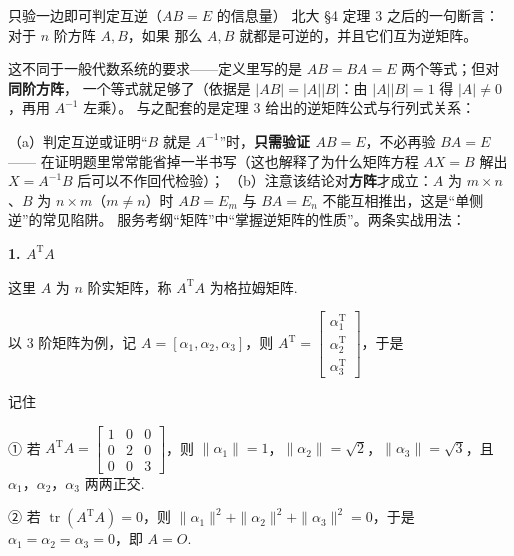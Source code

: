 \begin{fdeep}{只验一边即可判定互逆（$AB=E$ 的信息量）}
北大 §4 定理 3 之后的一句断言：对于 $n$ 阶方阵 $A,B$，如果
那么 $A,B$ 就都是可逆的，并且它们互为逆矩阵。

这不同于一般代数系统的要求——定义里写的是 $AB=BA=E$ 两个等式；但对\textbf{同阶方阵}，
一个等式就足够了（依据是 $|AB|=|A||B|$：由 $|A||B|=1$ 得 $|A|\ne0$，再用 $A^{-1}$ 左乘）。
与之配套的是定理 3 给出的逆矩阵公式与行列式关系：

（a）判定互逆或证明“$B$ 就是 $A^{-1}$”时，\textbf{只需验证 $AB=E$}，不必再验 $BA=E$——
在证明题里常常能省掉一半书写（这也解释了为什么矩阵方程 $AX=B$ 解出 $X=A^{-1}B$ 后可以不作回代检验）；
（b）注意该结论对\textbf{方阵}才成立：$A$ 为 $m\times n$、$B$ 为 $n\times m$（$m\ne n$）时
$AB=E_m$ 与 $BA=E_n$ 不能互相推出，这是“单侧逆”的常见陷阱。
\fbref{}服务考纲“矩阵”中“掌握逆矩阵的性质”。两条实战用法：
\end{fdeep}


\textbf{1. $A^{\mathrm T}A$}

这里 $A$ 为 $n$ 阶实矩阵，称 $A^{\mathrm T}A$ 为格拉姆矩阵.

以 3 阶矩阵为例，记 $A=[\alpha_1,\alpha_2,\alpha_3]$，则 $A^{\mathrm T}=\begin{bmatrix}\alpha_1^{\mathrm T}\\\alpha_2^{\mathrm T}\\\alpha_3^{\mathrm T}\end{bmatrix}$，于是
\begin{fkey}{记住}
\end{fkey}

① 若 $A^{\mathrm T}A=\begin{bmatrix}1&0&0\\0&2&0\\0&0&3\end{bmatrix}$，则 $\|\alpha_1\|=1$，$\|\alpha_2\|=\sqrt2$，$\|\alpha_3\|=\sqrt3$，且 $\alpha_1$，$\alpha_2$，$\alpha_3$ 两两正交.

② 若 $\operatorname{tr}(A^{\mathrm T}A)=0$，则 $\|\alpha_1\|^2+\|\alpha_2\|^2+\|\alpha_3\|^2=0$，于是 $\alpha_1=\alpha_2=\alpha_3=0$，即 $A=O$.

